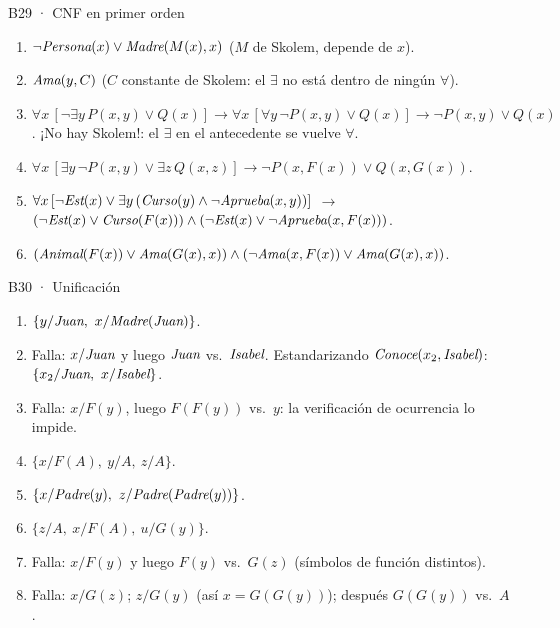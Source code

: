\begin{solucion}{B29 · CNF en primer orden}
\begin{enumerate}[label=(\alph*),nosep]
\item $\neg\textit{Persona}(x)\vee\textit{Madre}(M(x),x)$ \quad ($M$ de Skolem, depende de $x$).
\item $\textit{Ama}(y,C)$ \quad ($C$ constante de Skolem: el $\exists$ no está dentro de ningún $\forall$).
\item $\forall x\,[\neg\exists y\,P(x,y)\vee Q(x)]\to\forall x\,[\forall y\,\neg P(x,y)\vee Q(x)]\to\neg P(x,y)\vee Q(x)$.
¡No hay Skolem!: el $\exists$ en el antecedente se vuelve $\forall$.
\item $\forall x\,[\exists y\,\neg P(x,y)\vee\exists z\,Q(x,z)]\to\neg P(x,F(x))\vee Q(x,G(x))$.
\item $\forall x\,[\neg\textit{Est}(x)\vee\exists y\,(\textit{Curso}(y)\wedge\neg\textit{Aprueba}(x,y))]$ $\to$
$(\neg\textit{Est}(x)\vee\textit{Curso}(F(x)))\wedge(\neg\textit{Est}(x)\vee\neg\textit{Aprueba}(x,F(x)))$.
\item $(\textit{Animal}(F(x))\vee\textit{Ama}(G(x),x))\wedge(\neg\textit{Ama}(x,F(x))\vee\textit{Ama}(G(x),x))$.
\end{enumerate}
\end{solucion}

\begin{solucion}{B30 · Unificación}
\begin{enumerate}[label=(\alph*),nosep]
\item $\{y/\p{Juan},\ x/\p{Madre}(\p{Juan})\}$.
\item Falla: $x/\textit{Juan}$ y luego $\textit{Juan}$ vs.\ $\textit{Isabel}$. Estandarizando $\textit{Conoce}(x_2,\textit{Isabel})$: $\{x_2/\textit{Juan},\ x/\textit{Isabel}\}$.
\item Falla: $x/F(y)$, luego $F(F(y))$ vs.\ $y$: la verificación de ocurrencia lo impide.
\item $\{x/F(A),\ y/A,\ z/A\}$.
\item $\{x/\p{Padre}(y),\ z/\p{Padre}(\p{Padre}(y))\}$.
\item $\{z/A,\ x/F(A),\ u/G(y)\}$.
\item Falla: $x/F(y)$ y luego $F(y)$ vs.\ $G(z)$ (símbolos de función distintos).
\item Falla: $x/G(z)$; $z/G(y)$ (así $x=G(G(y))$); después $G(G(y))$ vs.\ $A$.
\end{enumerate}
\end{solucion}

